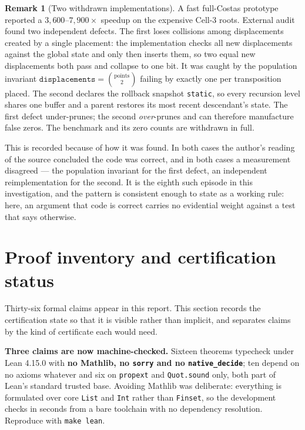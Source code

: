 \documentclass[11pt,a4paper]{article}
\theoremstyle{definition}
\newtheorem{remark}[theorem]{Remark}
\begin{document}
\begin{remark}[Two withdrawn implementations]
\label{rem:withdrawn}
A fast full-Costas prototype reported a $3{,}600$--$7{,}900\times$ speedup on the
expensive Cell-3 roots. External audit found two independent defects. The first
loses collisions among displacements created by a single placement: the
implementation checks all new displacements against the global state and only
then inserts them, so two equal new displacements both pass and collapse to one
bit. It was caught by the population invariant
$\texttt{displacements}=\binom{\text{points}}{2}$ failing by exactly one per
transposition placed. The second declares the rollback snapshot \texttt{static},
so every recursion level shares one buffer and a parent restores its most recent
descendant's state. The first defect under-prunes; the second \emph{over}-prunes
and can therefore manufacture false zeros. The benchmark and its zero counts are
withdrawn in full.

This is recorded because of how it was found. In both cases the author's reading
of the source concluded the code was correct, and in both cases a measurement
disagreed --- the population invariant for the first defect, an independent
reimplementation for the second. It is the eighth such episode in this
investigation, and the pattern is consistent enough to state as a working rule:
here, an argument that code is correct carries no evidential weight against a
test that says otherwise.
\end{remark}



\section{Proof inventory and certification status}
\label{sec:certificates}

Thirty-six formal claims appear in this report. This section records the
certification state so that it is visible rather than implicit, and separates
claims by the kind of certificate each would need.

\textbf{Three claims are now machine-checked.} Sixteen theorems typecheck under
Lean 4.15.0 with \textbf{no Mathlib, no \texttt{sorry} and no
\texttt{native\_decide}}; ten depend on no axioms whatever and six on
\texttt{propext} and \texttt{Quot.sound} only, both part of Lean's standard
trusted base. Avoiding Mathlib was deliberate: everything is formulated over core
\texttt{List} and \texttt{Int} rather than \texttt{Finset}, so the development
checks in seconds from a bare toolchain with no dependency resolution.
Reproduce with \texttt{make lean}.
\end{document}
